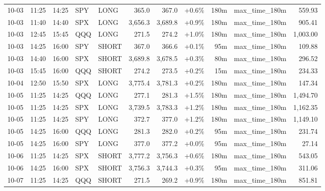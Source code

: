 \documentclass[11pt,a4paper,twoside]{article}
\begin{document}
\begin{center}
\begin{longtable}{>{\color{txtmain}}l l l l l r r r r >{\color{txtmain}}l r}
10-03 & 11:25 & 14:25 & SPY & LONG & 365.0 & 367.0 & \textcolor{wingreen}{+0.6\%} & 180m & max\_time\_180m & \textcolor{wingreen}{559.93} \\
10-03 & 11:40 & 14:40 & SPX & LONG & 3,656.3 & 3,689.8 & \textcolor{wingreen}{+0.9\%} & 180m & max\_time\_180m & \textcolor{wingreen}{905.41} \\
10-03 & 12:45 & 15:45 & QQQ & LONG & 271.5 & 274.2 & \textcolor{wingreen}{+1.0\%} & 180m & max\_time\_180m & \textcolor{wingreen}{1,003.00} \\
10-03 & 14:25 & 16:00 & SPY & SHORT & 367.0 & 366.6 & \textcolor{wingreen}{+0.1\%} & 95m & max\_time\_180m & \textcolor{wingreen}{109.88} \\
10-03 & 14:40 & 16:00 & SPX & SHORT & 3,689.8 & 3,678.5 & \textcolor{wingreen}{+0.3\%} & 80m & max\_time\_180m & \textcolor{wingreen}{296.52} \\
10-03 & 15:45 & 16:00 & QQQ & SHORT & 274.2 & 273.5 & \textcolor{wingreen}{+0.2\%} & 15m & max\_time\_180m & \textcolor{wingreen}{234.33} \\
10-04 & 12:50 & 15:50 & SPX & LONG & 3,775.4 & 3,781.3 & \textcolor{wingreen}{+0.2\%} & 180m & max\_time\_180m & \textcolor{wingreen}{147.34} \\
10-05 & 11:25 & 14:25 & QQQ & LONG & 277.1 & 281.3 & \textcolor{wingreen}{+1.5\%} & 180m & max\_time\_180m & \textcolor{wingreen}{1,494.70} \\
10-05 & 11:25 & 14:25 & SPX & LONG & 3,739.5 & 3,783.3 & \textcolor{wingreen}{+1.2\%} & 180m & max\_time\_180m & \textcolor{wingreen}{1,162.35} \\
10-05 & 11:25 & 14:25 & SPY & LONG & 372.7 & 377.0 & \textcolor{wingreen}{+1.2\%} & 180m & max\_time\_180m & \textcolor{wingreen}{1,149.10} \\
10-05 & 14:25 & 16:00 & QQQ & LONG & 281.3 & 282.0 & \textcolor{wingreen}{+0.2\%} & 95m & max\_time\_180m & \textcolor{wingreen}{231.74} \\
10-05 & 14:25 & 16:00 & SPY & LONG & 377.0 & 377.2 & \textcolor{wingreen}{+0.0\%} & 95m & max\_time\_180m & \textcolor{wingreen}{27.14} \\
10-06 & 11:25 & 14:25 & SPX & SHORT & 3,777.2 & 3,756.3 & \textcolor{wingreen}{+0.6\%} & 180m & max\_time\_180m & \textcolor{wingreen}{543.05} \\
10-06 & 14:25 & 16:00 & SPX & SHORT & 3,756.3 & 3,744.3 & \textcolor{wingreen}{+0.3\%} & 95m & max\_time\_180m & \textcolor{wingreen}{311.06} \\
10-07 & 11:25 & 14:25 & QQQ & SHORT & 271.5 & 269.2 & \textcolor{wingreen}{+0.9\%} & 180m & max\_time\_180m & \textcolor{wingreen}{851.81} \\

\end{longtable}
\end{center}
\end{document}
